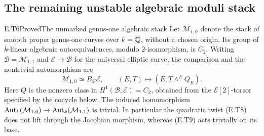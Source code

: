 \subsection{The remaining unstable algebraic moduli stack}

\begin{result}{E.T6}{Proved}{The unmarked genus-one algebraic stack}
Let $\mathcal M_{1,0}$ denote the stack of smooth proper
genus-one curves over $k=\overline{\mathbb Q}$, without a chosen
origin.  Its group of $k$-linear algebraic autoequivalences,
modulo $2$-isomorphism, is $C_2$.
Writing $\mathcal B=\mathcal M_{1,1}$ and
$\mathcal E\to\mathcal B$ for the universal elliptic curve,
the comparison and the nontrivial automorphism are
\[
 \mathcal M_{1,0}\simeq B_{\mathcal B}\mathcal E,
 \qquad (E,T)\longmapsto(E,T\mathbin{\wedge}^{E}Q_E).
 \tag{E.T9}
\]
Here $Q$ is the nonzero class in
$H^1(\mathcal B,\mathcal E)=C_2$, obtained from the
$\mathcal E[2]$-torsor specified by the cocycle below.
The induced homomorphism
$\operatorname{Aut}_k(\mathcal M_{1,0})\to\operatorname{Aut}_k(\mathcal M_{1,1})$
is trivial.  In particular the quadratic twist (E.T8)
does not lift through the Jacobian morphism, whereas
(E.T9) acts trivially on its base.
\end{result}

